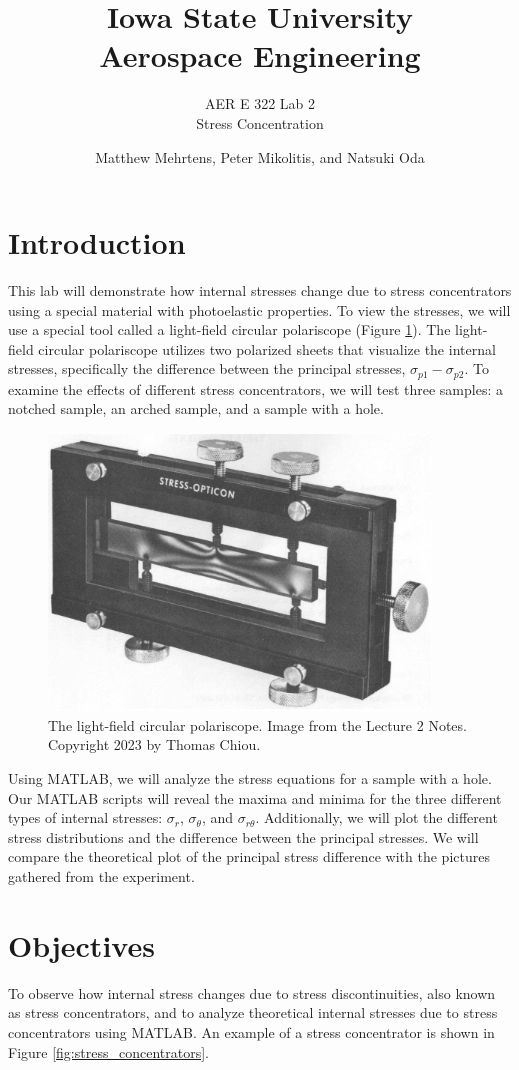 \documentclass[12 pt]{article}
\title{\textbf{Iowa State University
\\{\Large Aerospace Engineering}}}
\subtitle{AER E 322 Lab 2\\
		  Stress Concentration}
\author{Matthew Mehrtens, Peter Mikolitis, and Natsuki Oda}
\begin{document}
\maketitle
\tableofcontents
\section{Introduction} \label{introduction}
This lab will demonstrate how internal stresses change due to stress concentrators using a special material with photoelastic properties. To view the stresses, we will use a special tool called a light-field circular polariscope (Figure \ref{fig:apparatus}). The light-field circular polariscope utilizes two polarized sheets that visualize the internal stresses, specifically the difference between the principal stresses, $\sigma_{p1}-\sigma_{p2}$. To examine the effects of different stress concentrators, we will test three samples: a notched sample, an arched sample, and a sample with a hole.

\begin{figure}[htbp]
\centering
\includegraphics[width=4in]{images/Apparatus}
\caption{The light-field circular polariscope. Image from the Lecture 2 Notes. Copyright 2023 by Thomas Chiou.}
\label{fig:apparatus}
\end{figure}

Using MATLAB, we will analyze the stress equations for a sample with a hole. Our MATLAB scripts will reveal the maxima and minima for the three different types of internal stresses: $\sigma_r$, $\sigma_\theta$, and $\sigma_{r\theta}$. Additionally, we will plot the different stress distributions and the difference between the principal stresses. We will compare the theoretical plot of the principal stress difference with the pictures gathered from the experiment.

\section{Objectives} \label{objectives}
To observe how internal stress changes due to stress discontinuities, also known as stress concentrators, and to analyze theoretical internal stresses due to stress concentrators using MATLAB. An example of a stress concentrator is shown in Figure \ref{fig:stress_concentrators}.
\end{document}
